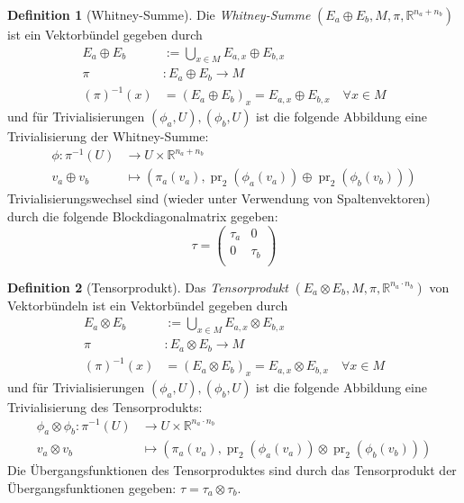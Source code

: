 \documentclass[a4paper]{scrreprt}
\numberwithin{equation}{chapter}
\DeclareMathOperator{\pr}{pr}
\newcommand{\R}{\mathbb{R}}
\theoremstyle{definition}
\newtheorem{defn}{Definition}[section]
\begin{document}
		\begin{defn}[Whitney-Summe]
			Die \emph{Whitney-Summe} $(E_a\oplus E_b ,M,\pi,\R^{n_a+n_b})$ ist ein Vektorbündel gegeben durch
			\begin{align*}
				E_a\oplus E_b&:=\bigcup_{x\in M}E_{a,x}\oplus E_{b,x}\\
				\pi&\colon E_a\oplus E_b\rightarrow M\\
				(\pi)^{-1}(x)&=(E_a\oplus E_b)_x=E_{a,x}\oplus E_{b,x}\quad \forall x\in M
			\end{align*}
			und für Trivialisierungen $(\phi_a,U),(\phi_b,U)$ ist die folgende Abbildung eine Trivialisierung der Whitney-Summe:
			\begin{align*}
				\phi\colon\pi^{-1}(U)&\rightarrow U\times \R^{n_a+n_b}\\
				v_a\oplus v_b&\mapsto (\pi_a(v_a), \pr_2(\phi_a(v_a))\oplus\pr_2(\phi_b(v_b)))
			\end{align*}
			Trivialisierungswechsel sind (wieder unter Verwendung von Spaltenvektoren) durch die folgende Blockdiagonalmatrix gegeben: 
			\begin{equation}
				\tau=\left(\begin{array}{cc}\tau_a&0\\0&\tau_b\\ \end{array}\right)
			\end{equation}
		\end{defn}
		\begin{defn}[Tensorprodukt]
			Das \emph{Tensorprodukt} $(E_a\otimes E_b ,M,\pi,\R^{n_a\cdot n_b})$ von Vektorbündeln ist ein Vektorbündel gegeben durch
			\begin{align*}
				E_a\otimes E_b&:=\bigcup_{x\in M}E_{a,x}\otimes E_{b,x}\\
				\pi&\colon E_a\otimes E_b\rightarrow M\\
				(\pi)^{-1}(x)&=(E_a\otimes E_b)_x=E_{a,x}\otimes E_{b,x}\quad \forall x\in M
			\end{align*}
			und für Trivialisierungen $(\phi_a,U),(\phi_b,U)$ ist die folgende Abbildung eine Trivialisierung des Tensorprodukts:
			\begin{align*}
				\phi_a\otimes\phi_b\colon\pi^{-1}(U)&\rightarrow U\times \R^{n_a\cdot n_b}\\
				v_a\otimes v_b&\mapsto (\pi_a(v_a), \pr_2(\phi_a(v_a))\otimes\pr_2(\phi_b(v_b)))
			\end{align*}
			Die Übergangsfunktionen des Tensorproduktes sind durch das Tensorprodukt der Übergangsfunktionen gegeben: $\tau=\tau_a\otimes\tau_b$.
		\end{defn}
		
\end{document}
